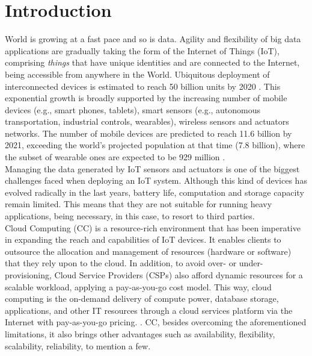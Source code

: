 \section{Introduction}\label{sec:Introduction}
\noindent World is growing at a fast pace and so is data. Agility and flexibility of big data applications are gradually taking the form of the Internet of Things (IoT), comprising \textit{things} that have unique identities and are connected to the Internet, being accessible from anywhere in the World. Ubiquitous deployment of interconnected devices is estimated to reach 50 billion units by 2020 \cite{evans2011internet}. This exponential growth is broadly supported by the increasing number of mobile devices (e.g., smart phones, tablets), smart sensors (e.g., autonomous transportation, industrial controls, wearables), wireless sensors and actuators networks. The number of mobile devices are predicted to reach 11.6 billion by 2021, exceeding the world’s projected population at that time (7.8 billion), where the subset of wearable ones are expected to be 929 million \cite{CiscoVis16:online}.\\
\noindent\tab Managing the data generated by IoT sensors and actuators is one of the biggest challenges faced when deploying an IoT system. Although this kind of devices has evolved radically in the last years, battery life, computation and storage capacity remain limited. This means that they are not suitable for running heavy applications, being necessary, in this case, to resort to third parties.\\
\noindent\tab Cloud Computing (CC) is a resource-rich environment that has been imperative in expanding the reach and capabilities of IoT devices. It enables clients to outsource the allocation and management of resources (hardware or software) that they rely upon to the cloud. In addition, to avoid over- or under-provisioning, Cloud Service Providers (CSPs) also afford dynamic resources for a scalable workload, applying a pay-as-you-go cost model. This way, cloud computing is the on-demand delivery of compute power, database storage, applications, and other IT resources through a cloud services platform via the Internet with pay-as-you-go pricing. \cite{WhatisCl79:online}. CC, besides overcoming the aforementioned limitations, it also brings other advantages such as availability, flexibility, scalability, reliability, to mention a few.\\
